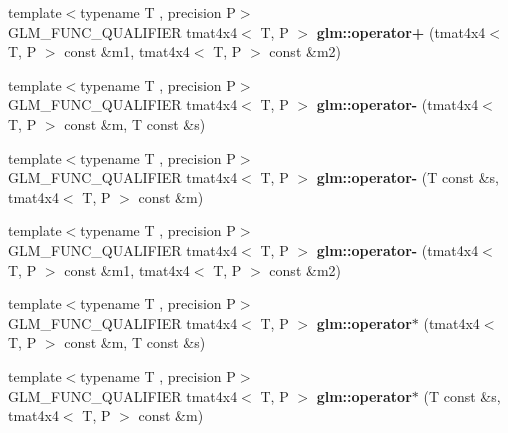 \begin{DoxyCompactItemize}
\item 
\hypertarget{namespaceglm_a25f82613cbb54d1328ba0c087361f23a}{{\footnotesize template$<$typename T , precision P$>$ }\\G\-L\-M\-\_\-\-F\-U\-N\-C\-\_\-\-Q\-U\-A\-L\-I\-F\-I\-E\-R tmat4x4$<$ T, P $>$ {\bfseries glm\-::operator+} (tmat4x4$<$ T, P $>$ const \&m1, tmat4x4$<$ T, P $>$ const \&m2)}\label{namespaceglm_a25f82613cbb54d1328ba0c087361f23a}

\item 
\hypertarget{namespaceglm_a663ddfcf136f3a13694686bb0697bbde}{{\footnotesize template$<$typename T , precision P$>$ }\\G\-L\-M\-\_\-\-F\-U\-N\-C\-\_\-\-Q\-U\-A\-L\-I\-F\-I\-E\-R tmat4x4$<$ T, P $>$ {\bfseries glm\-::operator-\/} (tmat4x4$<$ T, P $>$ const \&m, T const \&s)}\label{namespaceglm_a663ddfcf136f3a13694686bb0697bbde}

\item 
\hypertarget{namespaceglm_a24aba4a4b8f93adbdc8e6d301d713141}{{\footnotesize template$<$typename T , precision P$>$ }\\G\-L\-M\-\_\-\-F\-U\-N\-C\-\_\-\-Q\-U\-A\-L\-I\-F\-I\-E\-R tmat4x4$<$ T, P $>$ {\bfseries glm\-::operator-\/} (T const \&s, tmat4x4$<$ T, P $>$ const \&m)}\label{namespaceglm_a24aba4a4b8f93adbdc8e6d301d713141}

\item 
\hypertarget{namespaceglm_a0533c5ac15cb344bc9a67803717c5300}{{\footnotesize template$<$typename T , precision P$>$ }\\G\-L\-M\-\_\-\-F\-U\-N\-C\-\_\-\-Q\-U\-A\-L\-I\-F\-I\-E\-R tmat4x4$<$ T, P $>$ {\bfseries glm\-::operator-\/} (tmat4x4$<$ T, P $>$ const \&m1, tmat4x4$<$ T, P $>$ const \&m2)}\label{namespaceglm_a0533c5ac15cb344bc9a67803717c5300}

\item 
\hypertarget{namespaceglm_a60a8cd46716e5c76a3011578444ffef7}{{\footnotesize template$<$typename T , precision P$>$ }\\G\-L\-M\-\_\-\-F\-U\-N\-C\-\_\-\-Q\-U\-A\-L\-I\-F\-I\-E\-R tmat4x4$<$ T, P $>$ {\bfseries glm\-::operator$\ast$} (tmat4x4$<$ T, P $>$ const \&m, T const \&s)}\label{namespaceglm_a60a8cd46716e5c76a3011578444ffef7}

\item 
\hypertarget{namespaceglm_a227858cfdb144f8e65ba256f4f1797a8}{{\footnotesize template$<$typename T , precision P$>$ }\\G\-L\-M\-\_\-\-F\-U\-N\-C\-\_\-\-Q\-U\-A\-L\-I\-F\-I\-E\-R tmat4x4$<$ T, P $>$ {\bfseries glm\-::operator$\ast$} (T const \&s, tmat4x4$<$ T, P $>$ const \&m)}\label{namespaceglm_a227858cfdb144f8e65ba256f4f1797a8}


\end{DoxyCompactItemize}
